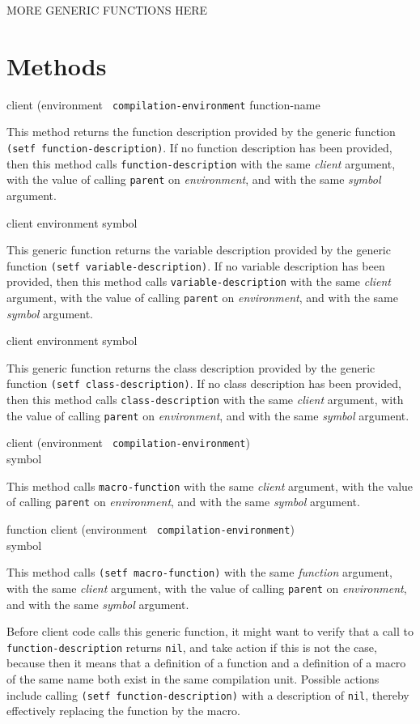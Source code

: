 MORE GENERIC FUNCTIONS HERE

\section{Methods}

 {client (environment {\tt
    compilation-environment} function-name}

This method returns the function description provided by the generic function
\texttt{(setf function-description)}. If no function description has been
provided, then this method calls \texttt{function-description} with the same
\textit{client} argument, with the value of calling \texttt{parent} on
\textit{environment}, and with the same \textit{symbol} argument.

 {client environment symbol}

This generic function returns the variable description provided by the generic
function \texttt{(setf variable-description)}. If no variable description has
been provided, then this method calls \texttt{variable-description} with the
same \textit{client} argument, with the value of calling \texttt{parent} on
\textit{environment}, and with the same \textit{symbol} argument.

 {client environment symbol}

This generic function returns the class description provided by the generic
function \texttt{(setf class-description)}. If no class description has been
provided, then this method calls \texttt{class-description} with the same
\textit{client} argument, with the value of calling \texttt{parent} on
\textit{environment}, and with the same \textit{symbol} argument.

{\small{} {client (environment {\tt
      compilation-environment}) \\ symbol}
}

This method calls \texttt{macro-function} with the same
\textit{client} argument, with the value of calling \texttt{parent} on
\textit{environment}, and with the same \textit{symbol} argument.

{\small{} {function client (environment {\tt
      compilation-environment}) \\ symbol}
}

This method calls \texttt{(setf macro-function)} with the same
\textit{function} argument, with the same \textit{client} argument, with
the value of calling \texttt{parent} on \textit{environment}, and with
the same \textit{symbol} argument.

Before client code calls this generic function, it might want to
verify that a call to \texttt{function-description} returns
\texttt{nil}, and take action if this is not the case, because then it
means that a definition of a function and a definition of a macro of
the same name both exist in the same compilation unit.  Possible
actions include calling \texttt{(setf function-description)} with a
description of \texttt{nil}, thereby effectively replacing the
function by the macro.
